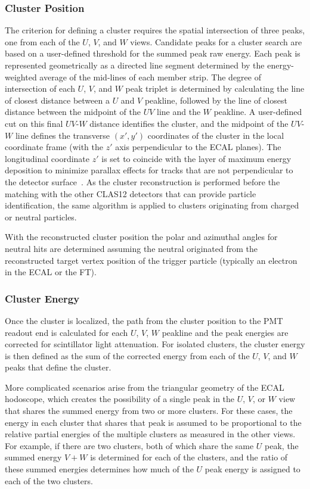 \subsubsection {Cluster Position}
\label{ec-cluster}

The criterion for defining a cluster requires the spatial intersection of three peaks, one from each of the $U$,
$V$, and $W$ views. Candidate peaks for a cluster search are based on a user-defined threshold for the
summed peak raw energy. Each peak is represented geometrically as a directed line segment determined by the
energy-weighted average of the mid-lines of each member strip. The degree of intersection of each $U$, $V$,
and $W$ peak triplet is determined by calculating the line of closest distance between a $U$ and $V$ peakline,
followed by the line of closest distance between the midpoint of the $UV$ line and the $W$ peakline. A
user-defined cut on this final $UV$-$W$ distance identifies the cluster, and the midpoint of the $UV$-$W$
line defines the transverse $(x',y')$ coordinates of the cluster in the local coordinate frame (with the $z'$
axis perpendicular to the ECAL planes). The longitudinal coordinate $z'$ is set to coincide with the layer of
maximum energy deposition to minimize parallax effects for tracks that are not perpendicular to the detector
surface~\cite{ecal-nim}. As the cluster reconstruction is performed before the matching with the other CLAS12
detectors that can provide particle identification, the same algorithm is applied to clusters originating from
charged or neutral particles.

With the reconstructed cluster position the polar and azimuthal angles for neutral hits are determined assuming
the neutral originated from the reconstructed target vertex position of the trigger particle (typically an electron
in the ECAL or the FT).

\subsubsection {Cluster Energy}

Once the cluster is localized, the path from the cluster position to the PMT readout end is calculated for each $U$,
$V$, $W$ peakline and the peak energies are corrected for scintillator light attenuation. For isolated clusters,
the cluster energy is then defined as the sum of the corrected energy from each of the $U$, $V$, and $W$ peaks
that define the cluster.

More complicated scenarios arise from the triangular geometry of the ECAL hodoscope, which creates the
possibility of a single peak in the $U$, $V$, or $W$ view that shares the summed energy from two or more
clusters. For these cases, the energy in each cluster that shares that peak is assumed to be proportional to the
relative partial energies of the multiple clusters as measured in the other views. For example, if there are two
clusters, both of which share the same $U$ peak, the summed energy $V+W$ is determined for each of the
clusters, and the ratio of these summed energies determines how much of the $U$ peak energy is assigned to
each of the two clusters.

